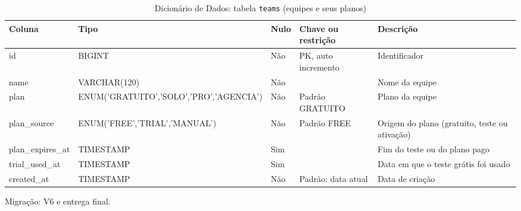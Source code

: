 \begin{table}[H]
\centering
\footnotesize
\caption{Dicionário de Dados: tabela \texttt{teams} (equipes e seus planos)}
\label{tab:dd-teams}
\begin{tabular}{|>{\raggedright\arraybackslash}p{3.0cm}|>{\raggedright\arraybackslash}p{3.2cm}|>{\centering\arraybackslash}p{0.8cm}|>{\raggedright\arraybackslash}p{3.0cm}|>{\raggedright\arraybackslash}p{3.8cm}|}
\hline
\textbf{Coluna} & \textbf{Tipo} & \textbf{Nulo} & \textbf{Chave ou restrição} & \textbf{Descrição} \\
\hline
id & BIGINT & Não & PK, auto incremento & Identificador \\
\hline
name & VARCHAR(120) & Não &  & Nome da equipe \\
\hline
plan & ENUM('GRATUITO',\allowbreak 'SOLO',\allowbreak 'PRO',\allowbreak 'AGENCIA') & Não & Padrão GRATUITO & Plano da equipe \\
\hline
plan\_\allowbreak{}source & ENUM('FREE',\allowbreak 'TRIAL',\allowbreak 'MANUAL') & Não & Padrão FREE & Origem do plano (gratuito, teste ou ativação) \\
\hline
plan\_\allowbreak{}expires\_\allowbreak{}at & TIMESTAMP & Sim &  & Fim do teste ou do plano pago \\
\hline
trial\_\allowbreak{}used\_\allowbreak{}at & TIMESTAMP & Sim &  & Data em que o teste grátis foi usado \\
\hline
created\_\allowbreak{}at & TIMESTAMP & Não & Padrão: data atual & Data de criação \\
\hline
\end{tabular}
\par\footnotesize Migração: V6 e entrega final.
\end{table}

